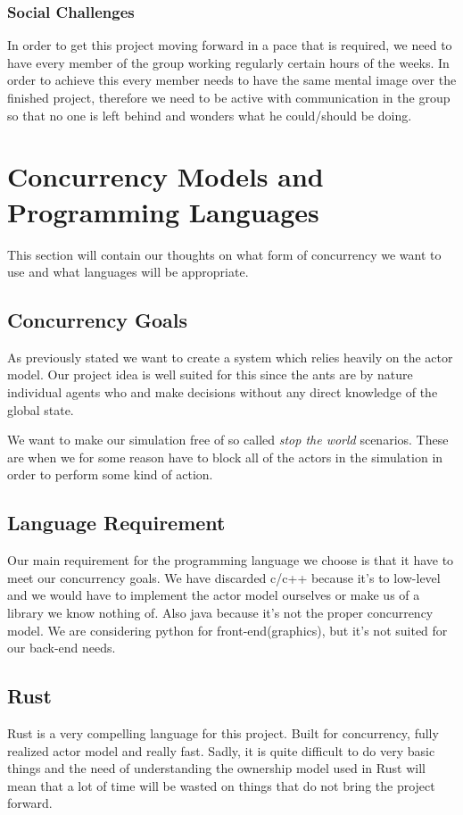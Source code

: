 \documentclass[a4paper]{article}
\begin{document}
\subsubsection{Social Challenges}
In order to get this project moving forward in a pace that is required, we need
to have every member of the group working regularly certain hours of the weeks.
In order to achieve this every member needs to have the same mental image over
the finished project, therefore we need to be active with communication in the
group so that no one is left behind and wonders what he could/should be doing.

\section{Concurrency Models and Programming Languages}
This section will contain our thoughts on what form of concurrency we want to
use and what languages will be appropriate.
\subsection{Concurrency Goals}
As previously stated we want to create a system which relies heavily on the actor
model. Our project idea is well suited for this since the ants are by nature
individual agents who and make decisions without any direct knowledge of the
global state.

We want to make our simulation free of so called \emph{stop the world}
scenarios. These are when we for some reason have to block all of the actors in
the simulation in order to perform some kind of action.

\subsection{Language Requirement}
Our main requirement for the programming language we choose is that it have to meet our concurrency goals.
We have discarded c/c++ because it's to low-level and we would have to implement the actor model ourselves or make us of a library we know nothing of. 
Also java because it's not the proper concurrency model. We are considering python for front-end(graphics),
but it's not suited for our back-end needs.

\subsection{Rust}
Rust is a very compelling language for this project. Built for concurrency, fully realized
actor model and really fast. Sadly, it is quite difficult to do very basic things and the need
of understanding the ownership model used in Rust will mean that a lot of time will be wasted
on things that do not bring the project forward. 
\end{document}
